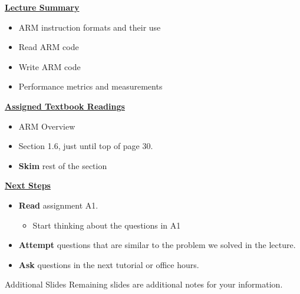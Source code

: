 \begin{frame}[fragile]
 \underline{\textbf{Lecture Summary}}
 \begin{itemize}
 \item ARM instruction formats and their use
 \item Read ARM code
 \item Write ARM code
 \item Performance metrics and measurements
 \end{itemize}
 \underline{\textbf{Assigned Textbook Readings}}
\begin{itemize}
     \item ARM Overview
     \item Section 1.6, just until top of page 30. 
     \item \textbf{Skim} rest of the section 
     \end{itemize}
    \underline{\textbf{Next Steps}}
    \begin{itemize}
\item \textbf{Read} assignment A1. 
\begin{itemize}
    \item Start thinking about the questions in A1
\end{itemize}
\item \textbf{Attempt} questions that are similar to the problem we solved in the lecture. 
    \item \textbf{Ask} questions in the next tutorial or office hours.
 \end{itemize}

 \end{frame}


\begin{frame}{Additional Slides}
    Remaining slides are additional notes for your information.
\end{frame}

